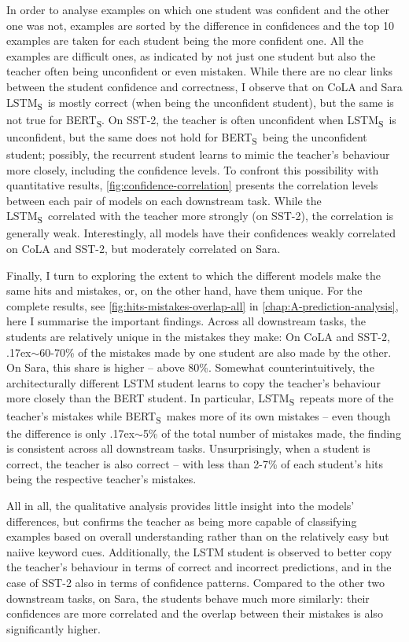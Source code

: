 \documentclass[bsc,frontabs,twoside,singlespacing,parskip,deptreport]{infthesis}
\def\mytilde{{\raise.17ex\hbox{$\scriptstyle\sim$}}}
\def\BERTS{BERT\textsubscript{S}}
\def\LSTMS{LSTM\textsubscript{S}}
\begin{document}
{{{      In order to analyse examples on which one student was confident and the other one was not, examples are sorted by the difference in confidences and the top 10 examples are taken for each student being the more confident one.
      All the examples are difficult ones, as indicated by not just one student but also the teacher often being unconfident or even mistaken.
      While there are no clear links between the student confidence and correctness, I observe that on CoLA and Sara \LSTMS~is mostly correct (when being the unconfident student), but the same is not true for \BERTS.
      On SST-2, the teacher is often unconfident when \LSTMS~is unconfident, but the same does not hold for \BERTS~being the unconfident student; possibly, the recurrent student learns to mimic the teacher's behaviour more closely, including the confidence levels.
      To confront this possibility with quantitative results, \autoref{fig:confidence-correlation} presents the correlation levels between each pair of models on each downstream task. While the \LSTMS~correlated with the teacher more strongly (on SST-2), the correlation is generally weak. Interestingly, all models have their confidences weakly correlated on CoLA and SST-2, but moderately correlated on Sara.

      Finally, I turn to exploring the extent to which the different models make the same hits and mistakes, or, on the other hand, have them unique.
      For the complete results, see \autoref{fig:hits-mistakes-overlap-all} in \autoref{chap:A-prediction-analysis}, here I summarise the important findings. 
      Across all downstream tasks, the students are relatively unique in the mistakes they make: On CoLA and SST-2, \mytilde60-70\% of the mistakes made by one student are also made by the other. On Sara, this share is higher -- above 80\%.
      Somewhat counterintuitively, the architecturally different LSTM student learns to copy the teacher's behaviour more closely than the BERT student.
      In particular, \LSTMS~repeats more of the teacher's mistakes while \BERTS~makes more of its own mistakes -- even though the difference is only \mytilde5\% of the total number of mistakes made, the finding is consistent across all downstream tasks. Unsurprisingly, when a student is correct, the teacher is also correct -- with less than 2-7\% of each student's hits being the respective teacher's mistakes.

      All in all, the qualitative analysis provides little insight into the models' differences, but confirms the teacher as being more capable of classifying examples based on overall understanding rather than on the relatively easy but naiive keyword cues.
      Additionally, the LSTM student is observed to better copy the teacher's behaviour in terms of correct and incorrect predictions, and in the case of SST-2 also in terms of confidence patterns. 
      Compared to the other two downstream tasks, on Sara, the students behave much more similarly: their confidences are more correlated and the overlap between their mistakes is also significantly higher.
    }
    
}}
\end{document}
